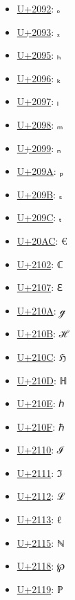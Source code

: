 \begin{itemize}
	\item \href{https://decodeunicode.org/en/u+2092}{U+2092}: ₒ
	\item \href{https://decodeunicode.org/en/u+2093}{U+2093}: ₓ
	\item \href{https://decodeunicode.org/en/u+2095}{U+2095}: ₕ
	\item \href{https://decodeunicode.org/en/u+2096}{U+2096}: ₖ
	\item \href{https://decodeunicode.org/en/u+2097}{U+2097}: ₗ
	\item \href{https://decodeunicode.org/en/u+2098}{U+2098}: ₘ
	\item \href{https://decodeunicode.org/en/u+2099}{U+2099}: ₙ
	\item \href{https://decodeunicode.org/en/u+209A}{U+209A}: ₚ
	\item \href{https://decodeunicode.org/en/u+209B}{U+209B}: ₛ
	\item \href{https://decodeunicode.org/en/u+209C}{U+209C}: ₜ
	\item \href{https://decodeunicode.org/en/u+20AC}{U+20AC}: €
	\item \href{https://decodeunicode.org/en/u+2102}{U+2102}: ℂ
	\item \href{https://decodeunicode.org/en/u+2107}{U+2107}: ℇ
	\item \href{https://decodeunicode.org/en/u+210A}{U+210A}: ℊ
	\item \href{https://decodeunicode.org/en/u+210B}{U+210B}: ℋ
	\item \href{https://decodeunicode.org/en/u+210C}{U+210C}: ℌ
	\item \href{https://decodeunicode.org/en/u+210D}{U+210D}: ℍ
	\item \href{https://decodeunicode.org/en/u+210E}{U+210E}: ℎ
	\item \href{https://decodeunicode.org/en/u+210F}{U+210F}: ℏ
	\item \href{https://decodeunicode.org/en/u+2110}{U+2110}: ℐ
	\item \href{https://decodeunicode.org/en/u+2111}{U+2111}: ℑ
	\item \href{https://decodeunicode.org/en/u+2112}{U+2112}: ℒ
	\item \href{https://decodeunicode.org/en/u+2113}{U+2113}: ℓ
	\item \href{https://decodeunicode.org/en/u+2115}{U+2115}: ℕ
	\item \href{https://decodeunicode.org/en/u+2118}{U+2118}: ℘
	\item \href{https://decodeunicode.org/en/u+2119}{U+2119}: ℙ

\end{itemize}
